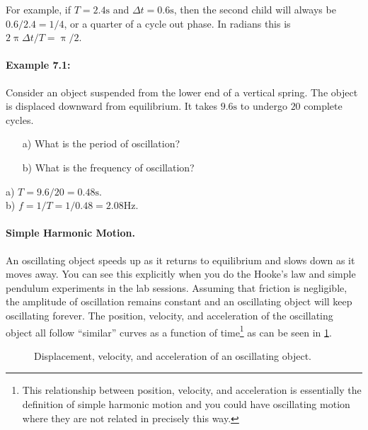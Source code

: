 \documentclass[a4paper,12pt]{book}
\begin{document}
For example, if $T=2.4\text{s}$ and $\Delta t=0.6\text{s}$, then the second child will always be $0.6/2.4=1/4$, or a quarter of a cycle out phase. In radians this is $2\uppi\Delta t/T=\uppi/2$.

\paragraph{Example 7.1:}Consider an object suspended from the lower end of a vertical spring. The object is displaced downward from equilibrium. It takes $9.6\text{s}$ to undergo $20$ complete cycles.
\begin{itemize}
\setlength{\itemsep}{-5pt}
    \item[a)] What is the period of oscillation?
    \item[b)] What is the frequency of oscillation?
\end{itemize}  
a) $T=9.6/20=0.48\text{s}$.\\

b) $f=1/T=1/0.48=2.08\text{Hz}$.\\


\paragraph{Simple Harmonic Motion.} An oscillating object speeds up as it returns to equilibrium and slows down as it moves away. You can see this explicitly when you do the Hooke's law and simple pendulum experiments in the lab sessions. Assuming that friction is negligible, the amplitude of oscillation remains constant and an oscillating object will keep oscillating forever. The position, velocity, and acceleration of the oscillating object all follow ``similar'' curves as a function of time\footnote{This relationship between position, velocity, and acceleration is essentially the definition of simple harmonic motion and you could have oscillating motion where they are not related in precisely this way.} as can be seen in \cref{fig: shm profile}.

\begin{figure}[ht]
    \centering
    \caption{Displacement, velocity, and acceleration of an oscillating object.}
        \label{fig: shm profile}
\end{figure}
\end{document}
